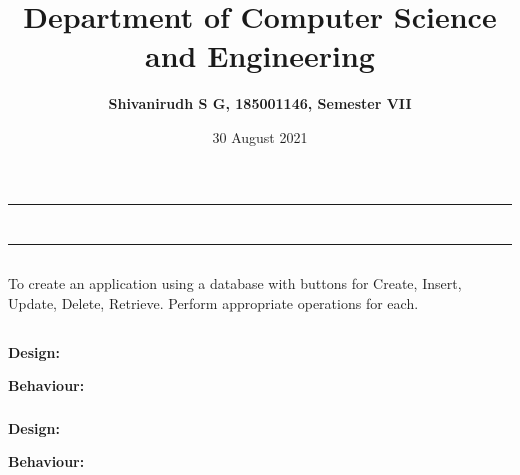 \documentclass[12pt,letterpaper]{article}
\title{\textbf{Department of Computer Science and Engineering}}
\author{\textbf{Shivanirudh S G, 185001146, Semester VII }}
\date{30 August 2021}
\begin{document}
\maketitle
\hrule
\section*{}
\hrule 
\bigskip\bigskip

\subsection*{}

\subsection*{}
\begin{flushleft}

    To create an application using a database with buttons for Create, Insert, Update, Delete, Retrieve. Perform appropriate operations for each.
\end{flushleft}

\subsection*{}
\subsubsection*{}
\textbf{Design:}
\begin{flushleft}

\end{flushleft}
\textbf{Behaviour:}
\begin{flushleft}

\end{flushleft}

\newpage
\subsubsection*{}
\textbf{Design:}
\begin{flushleft}

\end{flushleft}
\textbf{Behaviour:}
\begin{flushleft}

\end{flushleft}
\end{document}
